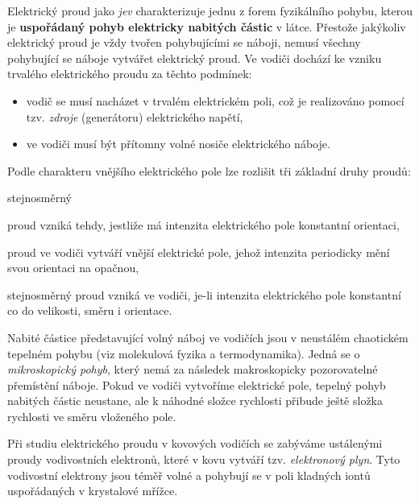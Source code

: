         Elektrický proud jako \emph{jev} charakterizuje jednu z forem fyzikálního pohybu, kterou je
        \textbf{uspořádaný pohyb elektricky nabitých částic} v látce. Přestože jakýkoliv elektrický
        proud je vždy tvořen pohybujícími se náboji, nemusí všechny pohybující se náboje vytvářet
        elektrický proud. Ve vodiči dochází ke vzniku trvalého elektrického proudu za těchto
        podmínek:
          \begin{itemize}\addtolength{\itemsep}{-0.5\baselineskip}
            \item vodič se musí nacházet v trvalém elektrickém poli, což je realizováno pomocí tzv.
                  \emph{zdroje} (generátoru) elektrického napětí,
            \item ve vodiči musí být přítomny volné nosiče elektrického náboje.
          \end{itemize}
        
        Podle charakteru vnějšího elektrického pole lze rozlišit tři základní druhy proudů:
          \begin{labeling}{stejnosměrný}\addtolength{\itemsep}{-0.5\baselineskip}
            \item[\textbf{stejnosměrný}] proud vzniká tehdy, jestliže má intenzita elektrického pole
                   konstantní orientaci,
            \item[\textbf{střídavý}] proud ve vodiči vytváří vnější elektrické pole, jehož intenzita
                  periodicky mění svou orientaci na opačnou,
            \item[\textbf{stacionární}] stejnosměrný proud vzniká ve vodiči, je-li intenzita
                  elektrického pole konstantní co do velikosti, směru i orientace.
          \end{labeling}  

       Nabité částice představující volný náboj ve vodičích jsou v neustálém chaotickém tepelném
       pohybu (viz molekulová fyzika a termodynamika). Jedná se o \emph{mikroskopický pohyb}, který
       nemá za následek makroskopicky pozorovatelné přemístění náboje. Pokud ve vodiči vytvoříme
       elektrické pole, tepelný pohyb nabitých částic neustane, ale k náhodné složce rychlosti
       přibude ještě složka rychlosti ve směru vloženého pole.
       
       Při studiu elektrického proudu v kovových vodičích se zabýváme ustálenými proudy
       vodivostních elektronů, které v kovu vytváří tzv. \emph{elektronový plyn}. Tyto vodivostní
       elektrony jsou téměř volné a pohybují se v poli kladných iontů uspořádaných v krystalové
       mřížce.
        
